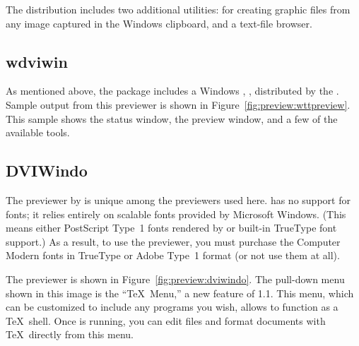 
\newpage
The  distribution includes two additional utilities:
 for creating  graphic files from any image
captured in the Windows clipboard, and  a text-file browser.

\subsection{wdviwin}

As mentioned above, the  package includes a Windows
\dvidriver, 
,
distributed by the .  
Sample output from this previewer is shown in
Figure~\ref{fig:preview:wttpreview}.
This sample shows the status window,
the preview window, and a few of the available tools.


\subsection{DVIWindo}

The 
 previewer by  is unique among the 
previewers used here.   has no support for  fonts;
it relies entirely on scalable fonts provided 
by Microsoft Windows.
(This means either PostScript Type~1 fonts rendered 
by  or built-in TrueType font
 support.)  As a result, to use
the  previewer, you must purchase the Computer
Modern fonts in TrueType or Adobe Type~1 format (or not use them at all).

The  previewer is shown in Figure~\ref{fig:preview:dviwindo}.
The pull-down menu shown in this image is the ``\TeX\ Menu,'' a new feature
of  1.1.  This menu, which can be customized to include
any programs you wish, allows  to function as a \TeX\ 
shell.  Once  is running, you can edit files and format
documents with \TeX\ directly from this menu.


